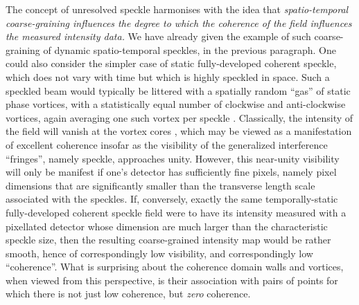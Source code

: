 \documentclass[%
 reprint,
 amsmath,amssymb,
 aps,
]{revtex4-1}
\begin{document}
The concept of unresolved speckle harmonises with the idea that {\em spatio-temporal coarse-graining influences the degree to which the coherence of the field influences the measured intensity data.}  We have already given the example of such coarse-graining of dynamic spatio-temporal speckles, in the previous paragraph.  One could also consider the simpler case of static fully-developed coherent speckle, which does not vary with time but which is highly speckled in space.  Such a speckled beam would typically be littered with a spatially random ``gas'' of static phase vortices, with a statistically equal number of clockwise and anti-clockwise vortices, again averaging one such vortex per speckle \cite{Goodman2007,paganin_book}.  Classically, the intensity of the field will vanish at the vortex cores \cite{Dirac1931}, which may be viewed as a manifestation of excellent coherence insofar as the visibility of the generalized interference ``fringes'', namely speckle, approaches unity.  However, this near-unity visibility will only be manifest if one's detector has sufficiently fine pixels, namely pixel dimensions that are significantly smaller than the transverse length scale associated with the speckles.  If, conversely, exactly the same temporally-static fully-developed coherent speckle field were to have its intensity measured with a pixellated detector whose dimension are much larger than the characteristic speckle size, then the resulting coarse-grained intensity map would be rather smooth, hence of correspondingly low visibility, and correspondingly low ``coherence''.  What is surprising about the coherence domain walls and vortices, when viewed from this perspective, is their association with pairs of points for which there is not just low coherence, but {\em zero} coherence.     
\end{document}
